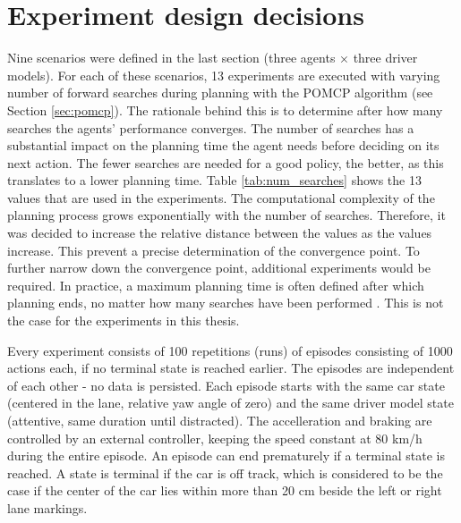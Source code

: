 \section{Experiment design decisions}

Nine scenarios were defined in the last section (three agents $\times$ three driver models). For each of these scenarios, 13 experiments are executed with varying number of forward searches during planning with the POMCP algorithm (see Section \ref{sec:pomcp}). The rationale behind this is to determine after how many searches the agents' performance converges. The number of searches has a substantial impact on the planning time the agent needs before deciding on its next action. The fewer searches are needed for a good policy, the better, as this translates to a lower planning time. Table \ref{tab:num_searches} shows the 13 values that are used in the experiments. The computational complexity of the planning process grows exponentially with the number of searches. Therefore, it was decided to increase the relative distance between the values as the values increase. This prevent a precise determination of the convergence point. To further narrow down the convergence point, additional experiments would be required. In practice, a maximum planning time is often defined after which planning ends, no matter how many searches have been performed \parencite{pomcp}. This is not the case for the experiments in this thesis.



Every experiment consists of 100 repetitions (runs) of episodes consisting of 1000 actions each, if no terminal state is reached earlier. The episodes are independent of each other - no data is persisted. Each episode starts with the same car state (centered in the lane, relative yaw angle of zero) and the same driver model state (attentive, same duration until distracted). The accelleration and braking are controlled by an external controller, keeping the speed constant at 80 km/h during the entire episode. An episode can end prematurely if a terminal state is reached. A state is terminal if the car is off track, which is considered to be the case if the center of the car lies within more than 20 cm beside the left or right lane markings.

